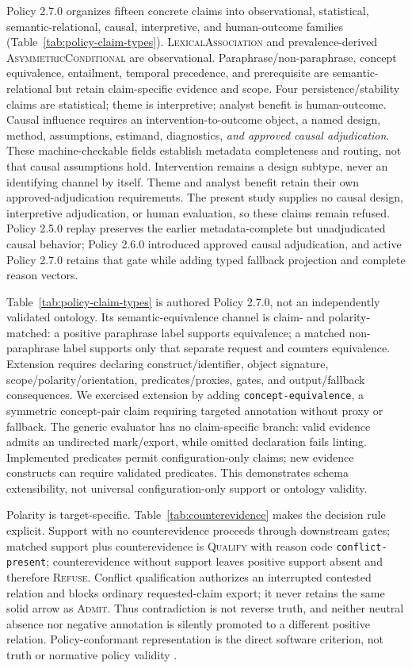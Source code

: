 \documentclass[manuscript,screen,review,anonymous]{acmart}
\begin{document}
Policy 2.7.0 organizes fifteen concrete claims into observational, statistical, semantic-relational, causal, interpretive, and human-outcome families (Table~\ref{tab:policy-claim-types}). \textsc{LexicalAssociation} and prevalence-derived \textsc{AsymmetricConditional} are observational. Paraphrase/non-paraphrase, concept equivalence, entailment, temporal precedence, and prerequisite are semantic-relational but retain claim-specific evidence and scope. Four persistence/stability claims are statistical; theme is interpretive; analyst benefit is human-outcome. Causal influence requires an intervention-to-outcome object, a named design, method, assumptions, estimand, diagnostics, \emph{and approved causal adjudication}. These machine-checkable fields establish metadata completeness and routing, not that causal assumptions hold. Intervention remains a design subtype, never an identifying channel by itself. Theme and analyst benefit retain their own approved-adjudication requirements. The present study supplies no causal design, interpretive adjudication, or human evaluation, so these claims remain refused. Policy 2.5.0 replay preserves the earlier metadata-complete but unadjudicated causal behavior; Policy 2.6.0 introduced approved causal adjudication, and active Policy 2.7.0 retains that gate while adding typed fallback projection and complete reason vectors.



Table~\ref{tab:policy-claim-types} is authored Policy 2.7.0, not an independently validated ontology. Its semantic-equivalence channel is claim- and polarity-matched: a positive paraphrase label supports equivalence; a matched non-paraphrase label supports only that separate request and counters equivalence. Extension requires declaring construct/identifier, object signature, scope/polarity/orientation, predicates/proxies, gates, and output/fallback consequences. We exercised extension by adding \texttt{concept-equivalence}, a symmetric concept-pair claim requiring targeted annotation without proxy or fallback. The generic evaluator has no claim-specific branch: valid evidence admits an undirected mark/export, while omitted declaration fails linting. Implemented predicates permit configuration-only claims; new evidence constructs can require validated predicates. This demonstrates schema extensibility, not universal configuration-only support or ontology validity.

Polarity is target-specific. Table~\ref{tab:counterevidence} makes the decision rule explicit. Support with no counterevidence proceeds through downstream gates; matched support plus counterevidence is \textsc{Qualify} with reason code \texttt{conflict-present}; counterevidence without support leaves positive support absent and therefore \textsc{Refuse}. Conflict qualification authorizes an interrupted contested relation and blocks ordinary requested-claim export; it never retains the same solid arrow as \textsc{Admit}. Thus contradiction is not reverse truth, and neither neutral absence nor negative annotation is silently promoted to a different positive relation. Policy-conformant representation is the direct software criterion, not truth or normative policy validity \cite{bolinska2016}.
\end{document}
